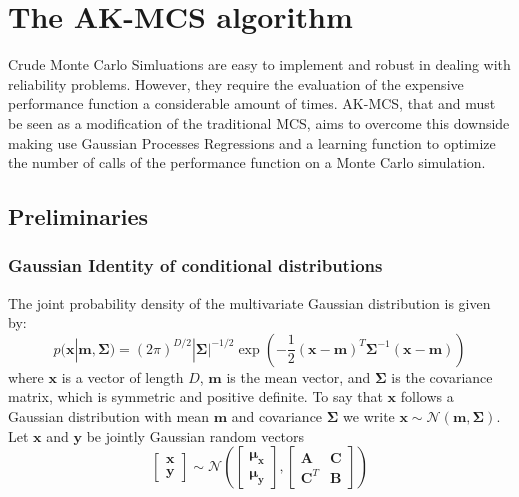 \chapter{The AK-MCS algorithm}
\label{ch:5}
Crude Monte Carlo Simluations are easy to implement and robust in dealing with 
reliability problems. However, they require the evaluation of the expensive performance
function a considerable amount of times. AK-MCS, that  and must be seen as a modification of the traditional MCS,
aims to overcome this downside making use Gaussian Processes
Regressions and a learning function to optimize the number of calls of the performance function
on a Monte Carlo simulation.
\section{Preliminaries}
\subsection{Gaussian Identity of conditional distributions}
The joint probability density of the multivariate Gaussian distribution is given by:
\begin{equation}
  p(\bm{x}|\bm{m},\bm{\Sigma}) = (2\pi)^{D/2}|\bm{\Sigma}|^{-1/2}\exp{\left(-\frac{1}{2}(\bm{x}-\bm{m})^{T}\bm{\Sigma}^{-1}(\bm{x}-\bm{m})\right)}
\end{equation}
where $\bm{x}$ is a vector of length $D$, $\bm{m}$ is the mean vector, and $\bm{\Sigma}$ is the covariance matrix, which is symmetric and positive definite. To say that $\bm{x}$ follows a Gaussian distribution with mean  $\bm{m}$ and covariance $\bm{\Sigma}$ we write $\bm{x} \sim \mathcal{N}(\bm{m}, \bm{\Sigma})$. \\

Let $\bm{x}$ and $\bm{y}$ be jointly Gaussian random vectors
\begin{equation}
  \begin{bmatrix}
    \bm{x} \\ \bm{y}
  \end{bmatrix}
  \sim \mathcal{N}\left(
    \begin{bmatrix}
    \bm{\mu_x} \\ \bm{\mu_y}
    \end{bmatrix} , \begin{bmatrix}
      \bm{A} & \bm{C} \\ \bm{C}^T & \bm{B}
    \end{bmatrix} \right)
\end{equation}

